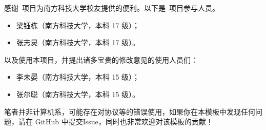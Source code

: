 感谢\sustechthesis\ 项目为南方科技大学校友提供的便利。以下是\sustechthesis\ 项目参与人员。
\begin{itemize}
    \item 梁钰栋（南方科技大学，本科 17 级）；
    \item 张志炅（南方科技大学，本科 17 级）。
\end{itemize}
以及使用本项目，并提出诸多宝贵的修改意见的使用人员们：
\begin{itemize}
    \item 李未晏（南方科技大学，本科 15 级）；
    \item 张尔聪（南方科技大学，本科 15 级）。
\end{itemize}

笔者并非计算机系，可能存在对协议等的错误使用，如果你在本模板中发现任何问题，请在 GitHub 中提交Issue，同时也非常欢迎对该模板的贡献！
